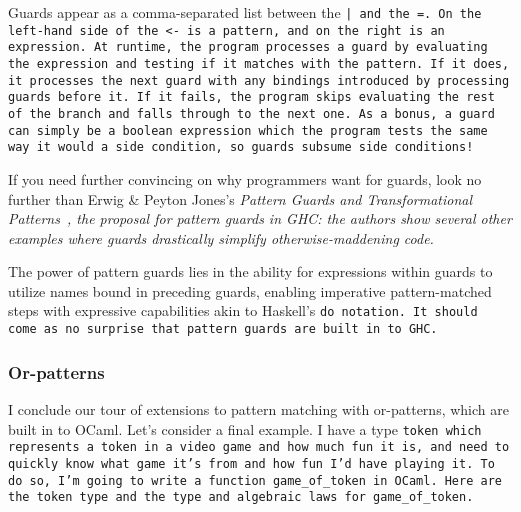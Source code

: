 \documentclass[manuscript,screen,review, 12pt, nonacm]{acmart}
\begin{document}
    Guards appear as a comma-separated list between the \tt{|} and the \tt{=}.
    On the left-hand side of the \tt{<-} is a pattern, and on the right is an
    expression. At runtime, the program processes a guard by evaluating the
    expression and testing if it matches with the pattern. If it does, it
    processes the next guard with any bindings introduced by processing guards
    before it. If it fails, the program skips evaluating the rest of the branch
    and falls through to the next one. As a bonus, a guard can simply be a
    boolean expression which the program tests the same way it would a side
    condition, so guards subsume side conditions! 
    
    If you need further convincing on why programmers want for guards, look no
    further than Erwig \& Peyton Jones's \it{Pattern Guards and Transformational
    Patterns}~\citep{guardproposal}, the proposal for pattern guards in GHC: the
    authors show several other examples where guards drastically simplify
    otherwise-maddening code. 
    
    The power of pattern guards lies in the ability for expressions within
    guards to utilize names bound in preceding guards, enabling imperative
    pattern-matched steps with expressive capabilities akin to Haskell's \tt{do}
    notation. It should come as no surprise that pattern guards are built in to
    GHC. \nolinebreak
\subsubsection{Or-patterns}
    I conclude our tour of extensions to pattern matching with or-patterns,
    which are built in to OCaml. Let's consider a final example. I have a type
    \tt{token} which represents a token in a video game and how much fun it is,
    and need to quickly know what game it's from and how fun I'd have playing
    it. To do so, I'm going to write a function \tt{game\_of\_token} in OCaml.
    Here are the \tt{token} type and the type and algebraic laws for
    \tt{game\_of\_token}. 
\end{document}
